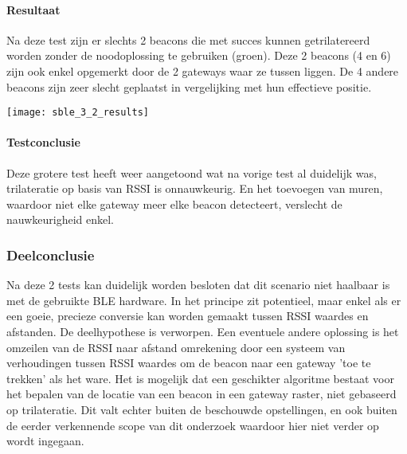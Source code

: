 \paragraph{Resultaat}
\begin{minipage}{0.55\textwidth}
Na deze test zijn er slechts 2 beacons die met succes kunnen getrilatereerd worden zonder de noodoplossing te gebruiken (groen). Deze 2 beacons (4 en 6) zijn ook enkel opgemerkt door de 2 gateways waar ze tussen liggen. De 4 andere beacons zijn zeer slecht geplaatst in vergelijking met hun effectieve positie.
\end{minipage}
\hfill
\begin{minipage}{0.42\textwidth}
	\texttt{[image: sble\_3\_2\_results]}
	\label{fig:ond-ble-static-3-2-res}
\end{minipage}

\paragraph{Testconclusie}
Deze grotere test heeft weer aangetoond wat na vorige test al duidelijk was, trilateratie op basis van RSSI is onnauwkeurig. En het toevoegen van muren, waardoor niet elke gateway meer elke beacon detecteert, verslecht de nauwkeurigheid enkel.

\subsubsection{Deelconclusie}
Na deze 2 tests kan duidelijk worden besloten dat dit scenario niet haalbaar is met de gebruikte BLE hardware. In het principe zit potentieel, maar enkel als er een goeie, precieze conversie kan worden gemaakt tussen RSSI waardes en afstanden. De deelhypothese is verworpen.
Een eventuele andere oplossing is het omzeilen van de RSSI naar afstand omrekening door een systeem van verhoudingen tussen RSSI waardes om de beacon naar een gateway 'toe te trekken' als het ware. Het is mogelijk dat een geschikter algoritme bestaat voor het bepalen van de locatie van een beacon in een gateway raster, niet gebaseerd op trilateratie. Dit valt echter buiten de beschouwde opstellingen, en ook buiten de eerder verkennende scope van dit onderzoek waardoor hier niet verder op wordt ingegaan.

